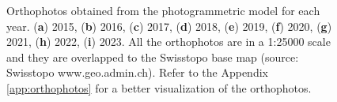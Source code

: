 \begin{figure}
{    }
    \caption{Orthophotos obtained from the photogrammetric model for each year.
        (\textbf{a}) 2015, (\textbf{b}) 2016, (\textbf{c}) 2017, (\textbf{d}) 2018,
        (\textbf{e}) 2019, (\textbf{f}) 2020, (\textbf{g}) 2021, (\textbf{h}) 2022, (\textbf{i})
        2023. All the orthophotos are in a 1:25000 scale and they are overlapped to the Swisstopo base map (source: Swisstopo
        www.geo.admin.ch). Refer to the Appendix \ref{app:orthophotos} for a better visualization of the orthophotos.
        }
    \label{fig:3:ortophoto}
\end{figure}

